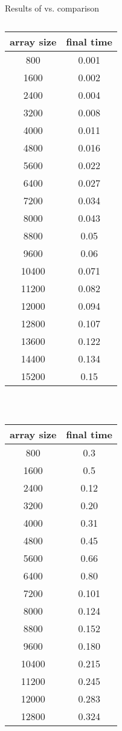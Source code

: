 \begin{description}
\begin{table}[ht]
\caption{Results of \cpp vs. \csharp comparison}\label{table:comparison}
\begin{subtable}[t]{0.3\textwidth}
\centering
\caption{\cpp}
\begin{tabular}{c | c }
array size & final time \\
\hline
800 & 0.001 \\
1600 & 0.002 \\
2400 & 0.004 \\
3200 & 0.008 \\
4000 & 0.011 \\
4800 & 0.016 \\
5600 & 0.022 \\
6400 & 0.027 \\
7200 & 0.034 \\
8000 & 0.043 \\
8800 & 0.05 \\
9600 & 0.06 \\
10400 & 0.071 \\
11200 & 0.082 \\
12000 & 0.094 \\
12800 & 0.107 \\
13600 & 0.122 \\
14400 & 0.134 \\
15200 & 0.15
\end{tabular}
\end{subtable}
~
\begin{subtable}[t]{0.3\textwidth}
\centering
\caption{\csharp}
\begin{tabular}{c | c}
array size & final time \\
\hline
800 & 0.3 \\
1600 & 0.5 \\
2400 & 0.12 \\
3200 & 0.20 \\
4000 & 0.31 \\
4800 & 0.45 \\
5600 & 0.66 \\
6400 & 0.80 \\
7200 & 0.101 \\
8000 & 0.124 \\
8800 & 0.152 \\
9600 & 0.180 \\
10400 & 0.215 \\
11200 & 0.245 \\
12000 & 0.283 \\
12800 & 0.324 \\

\end{tabular}
\end{subtable}
\end{table}
\end{description}
